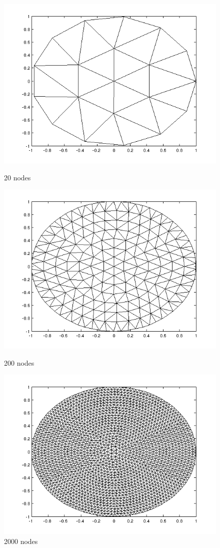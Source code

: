 \documentclass[paper=a4, fontsize=11pt]{scrartcl} %
\begin{document}
\begin{figure}[!htb]
  \includegraphics[width=\linewidth]{2d20.png}
  \caption{20 nodes}\label{fig:2d20}
\endminipage\hfill
{}
  \includegraphics[width=\linewidth]{2d200.png}
  \caption{200 nodes}\label{fig:2d200}
\endminipage\hfill
{}
  \includegraphics[width=\linewidth]{2d2000.png}
  \caption{2000 nodes}\label{fig:2d2000}
\endminipage
\end{figure}
\end{document}
